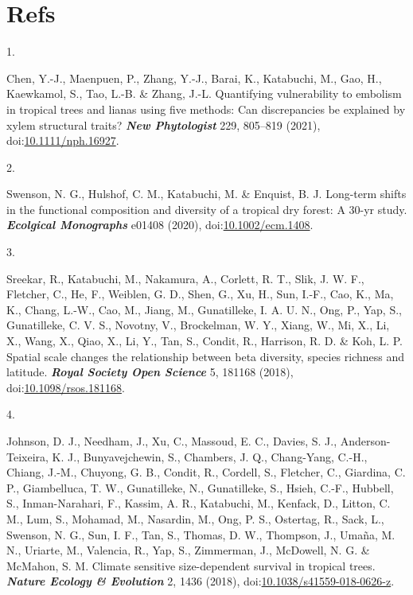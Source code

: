 \documentclass[
]{article}
\newlength{\cslhangindent}
\newlength{\csllabelwidth}
\newlength{\cslentryspacingunit} %
\newenvironment{CSLReferences}[2] %
 {%
  \setlength{\parindent}{0pt}
  \ifodd #1
  \let\oldpar\par
  \def\par{\hangindent=\cslhangindent\oldpar}
  \fi
  \setlength{\parskip}{#2\cslentryspacingunit}
 }%
 {}
\newcommand{\CSLLeftMargin}[1]{\parbox[t]{\csllabelwidth}{#1}}
\newcommand{\CSLRightInline}[1]{\parbox[t]{\linewidth - \csllabelwidth}{#1}\break}
\begin{document}
\hypertarget{refs}{%
\section*{Refs}\label{refs}}

\hypertarget{refs}{}
\begin{CSLReferences}{0}{0}
\leavevmode{}%
\CSLLeftMargin{1. }
\CSLRightInline{Chen, Y.-J., Maenpuen, P., Zhang, Y.-J., Barai, K.,
Katabuchi, M., Gao, H., Kaewkamol, S., Tao, L.-B. \& Zhang, J.-L.
Quantifying vulnerability to embolism in tropical trees and lianas using
five methods: Can discrepancies be explained by xylem structural traits?
\textbf{\emph{New Phytologist}} 229, 805--819 (2021),
doi:\href{https://doi.org/10.1111/nph.16927}{10.1111/nph.16927}.}

\leavevmode{}%
\CSLLeftMargin{2. }
\CSLRightInline{Swenson, N. G., Hulshof, C. M., Katabuchi, M. \&
Enquist, B. J. Long-term shifts in the functional composition and
diversity of a tropical dry forest: A 30-yr study.
\textbf{\emph{Ecolgical Monographs}} e01408 (2020),
doi:\href{https://doi.org/10.1002/ecm.1408}{10.1002/ecm.1408}.}

\leavevmode{}%
\CSLLeftMargin{3. }
\CSLRightInline{Sreekar, R., Katabuchi, M., Nakamura, A., Corlett, R.
T., Slik, J. W. F., Fletcher, C., He, F., Weiblen, G. D., Shen, G., Xu,
H., Sun, I.-F., Cao, K., Ma, K., Chang, L.-W., Cao, M., Jiang, M.,
Gunatilleke, I. A. U. N., Ong, P., Yap, S., Gunatilleke, C. V. S.,
Novotny, V., Brockelman, W. Y., Xiang, W., Mi, X., Li, X., Wang, X.,
Qiao, X., Li, Y., Tan, S., Condit, R., Harrison, R. D. \& Koh, L. P.
Spatial scale changes the relationship between beta diversity, species
richness and latitude. \textbf{\emph{Royal Society Open Science}} 5,
181168 (2018),
doi:\href{https://doi.org/10.1098/rsos.181168}{10.1098/rsos.181168}.}

\leavevmode{}%
\CSLLeftMargin{4. }
\CSLRightInline{Johnson, D. J., Needham, J., Xu, C., Massoud, E. C.,
Davies, S. J., Anderson-Teixeira, K. J., Bunyavejchewin, S., Chambers,
J. Q., Chang-Yang, C.-H., Chiang, J.-M., Chuyong, G. B., Condit, R.,
Cordell, S., Fletcher, C., Giardina, C. P., Giambelluca, T. W.,
Gunatilleke, N., Gunatilleke, S., Hsieh, C.-F., Hubbell, S.,
Inman-Narahari, F., Kassim, A. R., Katabuchi, M., Kenfack, D., Litton,
C. M., Lum, S., Mohamad, M., Nasardin, M., Ong, P. S., Ostertag, R.,
Sack, L., Swenson, N. G., Sun, I. F., Tan, S., Thomas, D. W., Thompson,
J., Umaña, M. N., Uriarte, M., Valencia, R., Yap, S., Zimmerman, J.,
McDowell, N. G. \& McMahon, S. M. {Climate sensitive size-dependent
survival in tropical trees}. \textbf{\emph{Nature Ecology {\&}
Evolution}} 2, 1436 (2018),
doi:\href{https://doi.org/10.1038/s41559-018-0626-z}{10.1038/s41559-018-0626-z}.}


\end{CSLReferences}
\end{document}

